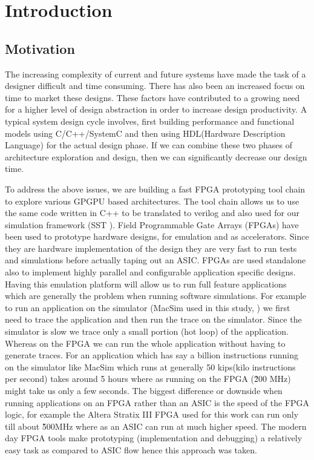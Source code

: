 \setcounter{equation}{0}

\chapter{Introduction}
\label{chap:introduction}

\section{Motivation}
The increasing complexity of current and future systems have made the task of a designer difficult and time consuming. There has also been an increased focus on time to market these designs. These factors have contributed to a growing need for a higher level of design abstraction in order to increase design productivity. A typical system design cycle involves, first building performance and functional models using C/C++/SystemC and then using HDL(Hardware Description Language) for the actual design phase. If we can combine these two phases of architecture exploration and design, then we can significantly decrease our design time.

To address the above issues, we are building a fast FPGA prototyping tool chain to explore various GPGPU based architectures. The tool chain allows us to use the same code written in C++ to be translated to verilog and also used for our simulation framework (SST \cite{SST}).
Field Programmable Gate Arrays (FPGAs) have been used to prototype hardware designs, for emulation and as accelerators. Since they are hardware implementation of the design they are very fast to run tests and simulations before actually taping out an ASIC. FPGAs are used standalone also to implement highly parallel and configurable application specific designs. Having this emulation platform will allow us to run full feature applications which are generally the problem when running software simulations. For example to run an application on the simulator (MacSim used in this study, \cite{macsim}) we first need to trace the application and then run the trace on the simulator. Since the simulator is slow we trace only a small portion (hot loop) of the application. Whereas on the FPGA we can run the whole application without having to generate traces. For an application which has say a billion instructions running on the simulator like MacSim which runs at generally 50 kips(kilo instructions per second) takes around 5 hours where as running on the FPGA (\~ 200 MHz) might take us only a few seconds. The biggest difference or downside when running applications on an FPGA rather than an ASIC is the speed of the FPGA logic, for example the Altera Stratix III FPGA used for this work can run only till about \~500MHz where as an ASIC can run at much higher speed. The modern day FPGA tools make prototyping (implementation and debugging) a relatively easy task as compared to ASIC flow hence this approach was taken.

